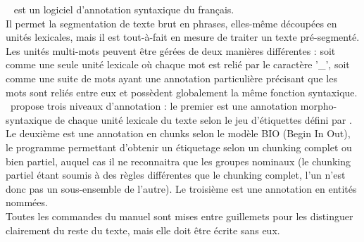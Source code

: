 \documentclass[manual-fr.tex]{subfiles}
\begin{document}
\SEMFull\ \cite{Tellier_demo2012} est un logiciel d'annotation syntaxique du français.\\

Il permet la segmentation de texte brut en phrases, elles-même découpées en unités lexicales, mais il est tout-à-fait en mesure de traiter un texte pré-segmenté. Les unités multi-mots peuvent être gérées de deux manières différentes : soit comme une seule unité lexicale où chaque mot est relié par le caractère '\_', soit comme une suite de mots ayant une annotation particulière précisant que les mots sont reliés entre eux et possèdent globalement la même fonction syntaxique.\\

\SEM\ propose trois niveaux d'annotation : le premier est une annotation morpho-syntaxique de chaque unité lexicale du texte selon le jeu d'étiquettes défini par \cite{Crabbe08}. Le deuxième est une annotation en chunks selon le modèle BIO (Begin In Out), le programme permettant d'obtenir un étiquetage selon un chunking complet ou bien partiel, auquel cas il ne reconnaitra que les groupes nominaux (le chunking partiel étant soumis à des règles différentes que le chunking complet, l'un n'est donc pas un sous-ensemble de l'autre). Le troisième est une annotation en entités nommées.\\

Toutes les commandes du manuel sont mises entre guillemets pour les distinguer clairement du reste du texte, mais elle doit être écrite sans eux.
\end{document}
